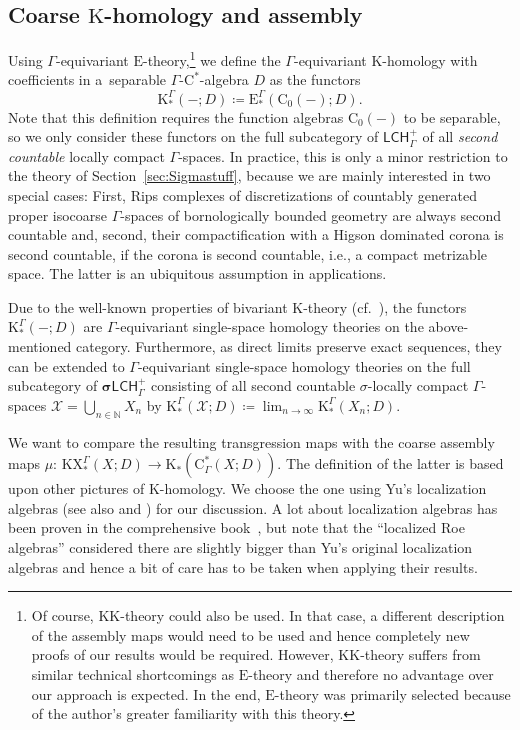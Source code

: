 \documentclass[pdftex]{sigma}
\numberwithin{equation}{section}
\theoremstyle{definition}
\newcommand{\N}{\mathbb{N}}
\newcommand{\cX}{\mathcal{X}}
\newcommand{\Ct}{\mathrm{C}}
\newcommand{\Cz}{\Ct_0}
\newcommand{\categoryfont}[1]{\mathsf{#1}}
\newcommand{\sLCHp}[1][\Gamma]{\boldsymbol\sigma\categoryfont{LCH}_{#1}^+}
\newcommand{\LCHp}[1][\Gamma]{\categoryfont{LCH}_{#1}^+}
\newcommand{\KX}{\mathrm{KX}}
\newcommand{\K}{\mathrm{K}}
\newcommand{\KK}{\mathrm{KK}}
\newcommand{\EE}{\mathrm{E}}
\newcommand{\textCstar}{\ensuremath{\mathrm{C}^*\!}}
\newcommand{\Roe}{\mathrm{C}^*}
\newcommand{\blank}{-}
\begin{document}
\subsection[Coarse K-homology and assembly]{Coarse $\boldsymbol{\K}$-homology and assembly}\label{sec:Assembly}

Using $\Gamma$-equivariant $\EE$-theory,\footnote{Of course, $\KK$-theory could also be used. In that case, a different description of the assembly maps would need to be used and hence completely new proofs of our results would be required. However, $\KK$-theory suffers from similar technical shortcomings as $\EE$-theory and therefore no advantage over our approach is expected. In the end, $\EE$-theory was primarily selected because of the author's greater familiarity with this theory.} we define the $\Gamma$-equivariant $\K$-homology with coefficients in a~separable $\Gamma$-\textCstar-algebra $D$ as the functors
\[
\K^\Gamma_*(\blank;D)\coloneqq \EE^\Gamma_*(\Cz(\blank);D).
\]
Note that this definition requires the function algebras $\Cz(\blank)$ to be separable, so we only consider these functors on the full subcategory of $\LCHp$ of all \emph{second countable} locally compact $\Gamma$-spaces.
In practice, this is only a minor restriction to the theory of Section~\ref{sec:Sigmastuff}, because we are mainly interested in two special cases: First, Rips complexes of discretizations of countably generated proper isocoarse $\Gamma$-spaces of bornologically bounded geometry are always second countable and, second, their compactification with a Higson dominated corona is second countable, if the corona is second countable, i.e., a compact metrizable space. The latter is an ubiquitous assumption in applications.


Due to the well-known properties of bivariant $\K$-theory (cf.\ \cite[Chapter~6]{GueHigTro}), the functors $\K^\Gamma_*(\blank;D)$ are $\Gamma$-equivariant single-space homology theories on the above-mentioned category. Furthermore, as direct limits preserve exact sequences, they can be extended to $\Gamma$-equivariant single-space homology theories on the full subcategory of $\sLCHp$ consisting of all second countable $\sigma$-locally compact $\Gamma$-spaces $\cX=\bigcup_{n\in\N}X_n$ by
\(\K^\Gamma_*(\cX;D)\coloneqq\lim_{n\to\infty}\K^\Gamma_*(X_n;D)\).


We want to compare the resulting transgression maps with the coarse assembly maps $\mu$: $\KX^\Gamma_*(X;D)\to\K_*(\Roe_\Gamma(X;D))$. The definition of the latter is based upon other pictures of $\K$-homology.
We choose the one using Yu's localization algebras \cite{YuLocalization} (see also \cite{QiaoRoe} and \cite{EngelWulffZeidler}) for our discussion.
A lot about localization algebras has been proven in the comprehensive book~\cite{WillettYuHigherIndexTheory}, but note that the ``localized Roe algebras'' considered there are slightly bigger than Yu's original localization algebras and hence a bit of care has to be taken when applying their results.
\end{document}
